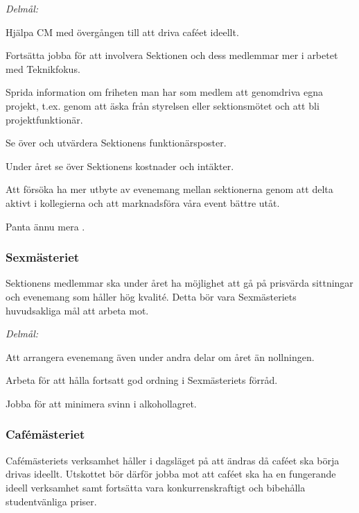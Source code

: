 \documentclass[../_main/handlingar.tex]{subfiles}
\begin{document}
\emph{Delmål:}
\begin{dashlist}
    \item Hjälpa CM med övergången till att driva caféet ideellt.
    \item Fortsätta jobba för att involvera Sektionen och dess medlemmar mer i arbetet med Teknikfokus.
    \item Sprida information om friheten man har som medlem att genomdriva egna projekt, t.ex. genom att äska från styrelsen eller sektionsmötet och att bli projektfunktionär.
    \item Se över och utvärdera Sektionens funktionärsposter.
    \item Under året se över Sektionens kostnader och intäkter.
    \item Att försöka ha mer utbyte av evenemang mellan sektionerna genom att delta aktivt i kollegierna och att marknadsföra våra event bättre utåt.
    \item Panta ännu mera \scalebox{0.4}{\recycle}.
\end{dashlist}

\subsubsection*{Sexmästeriet}
Sektionens medlemmar ska under året ha möjlighet att gå på prisvärda sittningar och evenemang som håller hög kvalité. Detta bör vara Sexmästeriets huvudsakliga mål att arbeta mot.

\emph{Delmål:}
\begin{dashlist}
    \item Att arrangera evenemang även under andra delar om året än nollningen.
    \item Arbeta för att hålla fortsatt god ordning i Sexmästeriets förråd.
    \item Jobba för att minimera svinn i alkohollagret.
\end{dashlist}

\newpage

\subsubsection*{Cafémästeriet}
Cafémästeriets verksamhet håller i dagsläget på att ändras då caféet ska börja drivas ideellt. Utskottet bör därför jobba mot att caféet ska ha en fungerande ideell verksamhet samt fortsätta vara konkurrenskraftigt och bibehålla studentvänliga priser.
\end{document}
